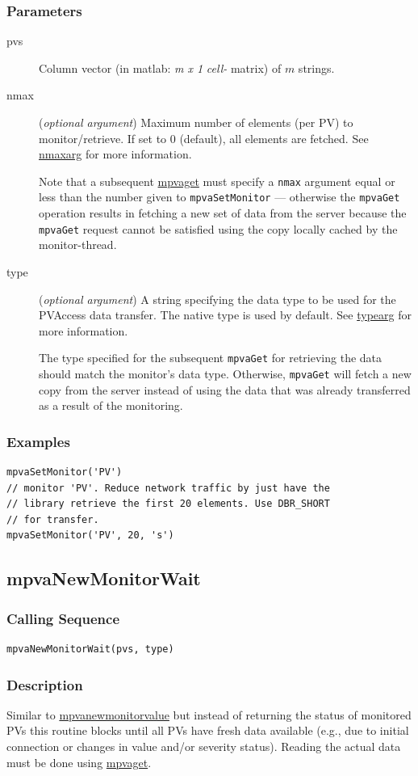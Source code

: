 \documentclass{article}
\newcommand{\com}[1]{{\tt #1}}
\newcommand{\pbrk}{\pagebreak[3]}
\newcommand{\comref}[2]{\hyperref{\com{#1}}{\com{#1} (see }{)}{#2}}
\newcommand{\ita}[1]{\emph{#1}}
\newcommand{\m}{$m$}
\newcommand{\mhack}{$m$} %
\newcommand{\mxl}{$m\times 1$}
\renewcommand{\m}{\ita{m}}
\newcommand{\mhack}{\ita{m}} %
\renewcommand{\mxl}{\ita{m x 1}}
\renewcommand{\pbrk}{}
\newcommand{\PVITEM}{
\item[pvs] Column vector (in matlab: \mxl{} \ita{cell-} matrix)
of \mhack{} strings.
}
\begin{document}
\subsubsection{Parameters}
\begin{description}
\PVITEM
\item[nmax]
(\ita{optional argument}) Maximum number of elements
(per PV) to monitor/retrieve. If set to 0 (default), all elements are fetched.
See \hyperref{here}{(}{)}{nmaxarg} for more information.

Note that a subsequent \comref{mpvaGet}{mpvaget} must specify a \com{nmax}
argument equal or less than the number given to \com{mpvaSetMonitor} ---
otherwise the \com{mpvaGet} operation results in fetching a new
set of data from the server because the \com{mpvaGet} request cannot
be satisfied using the copy locally cached by the monitor-thread.
\item[type]
(\ita{optional argument}) A string specifying the
data type to be used for the PVAccess data transfer. The
native type is used by default.
See \hyperref{here}{(}{)}{typearg} for more information.

The type specified for the subsequent \com{mpvaGet} for retrieving
the data should match the monitor's data type. Otherwise, \com{mpvaGet}
will fetch a new copy from the server instead of using the data that
was already transferred as a result of the monitoring.
\end{description}
\subsubsection{Examples}
\begin{verbatim}
mpvaSetMonitor('PV')
// monitor 'PV'. Reduce network traffic by just have the
// library retrieve the first 20 elements. Use DBR_SHORT
// for transfer.
mpvaSetMonitor('PV', 20, 's')
\end{verbatim}

\pbrk
\subsection{mpvaNewMonitorWait}
\label{mpvanewmonitorwait}
\subsubsection{Calling Sequence}
\begin{verbatim}
mpvaNewMonitorWait(pvs, type)
\end{verbatim}
\subsubsection{Description}
Similar to \comref{mpvaNewMonitorValue}{mpvanewmonitorvalue} but instead of
returning the status of monitored PVs this routine blocks until all PVs
have fresh data available (e.g., due to initial connection or changes in
value and/or severity status).
Reading the actual data must be done using \comref{mpvaGet}{mpvaget}.
\end{document}
